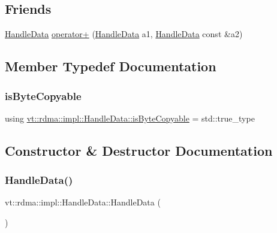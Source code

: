 \subsection*{Friends}
\begin{DoxyCompactItemize}
\item 
\hyperlink{structvt_1_1rdma_1_1impl_1_1_handle_data}{Handle\+Data} \hyperlink{structvt_1_1rdma_1_1impl_1_1_handle_data_a0db838048458aea13961a4e3494c6ddb}{operator+} (\hyperlink{structvt_1_1rdma_1_1impl_1_1_handle_data}{Handle\+Data} a1, \hyperlink{structvt_1_1rdma_1_1impl_1_1_handle_data}{Handle\+Data} const \&a2)
\end{DoxyCompactItemize}


\subsection{Member Typedef Documentation}
\mbox{\label{structvt_1_1rdma_1_1impl_1_1_handle_data_a1178bd6a0f3adfaa3fc2dfed97e65fa7}} 
\subsubsection{\texorpdfstring{is\+Byte\+Copyable}{isByteCopyable}}
{\footnotesize\ttfamily using \hyperlink{structvt_1_1rdma_1_1impl_1_1_handle_data_a1178bd6a0f3adfaa3fc2dfed97e65fa7}{vt\+::rdma\+::impl\+::\+Handle\+Data\+::is\+Byte\+Copyable} =  std\+::true\+\_\+type}



\subsection{Constructor \& Destructor Documentation}
\mbox{\label{structvt_1_1rdma_1_1impl_1_1_handle_data_adb5fa646ed809e1eee6dc1b3a92c53a1}} 
\subsubsection{\texorpdfstring{Handle\+Data()}{HandleData()}\hspace{0.1cm}{\footnotesize\ttfamily [1/2]}}
{\footnotesize\ttfamily vt\+::rdma\+::impl\+::\+Handle\+Data\+::\+Handle\+Data (\begin{DoxyParamCaption}{ }\end{DoxyParamCaption})}

